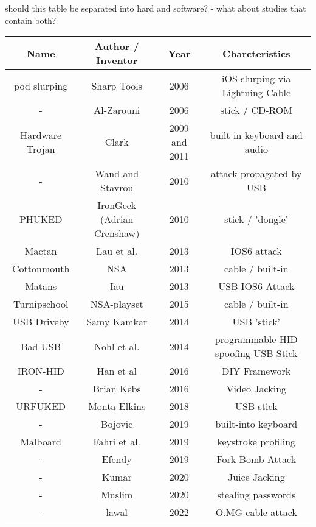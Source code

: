 should this table be separated into hard and software? - what about studies that contain both?
\begin{center}
\begin{tabular}{|c c c c|} 
 \hline
 Name & Author / Inventor & Year & Charcteristics \\ [0.5ex] 
 \hline \hline
 pod slurping & Sharp Tools \cite{SharpIdeasDownloads2006} & 2006 & iOS slurping via Lightning Cable \\
 \hline
 -  &  Al-Zarouni \cite{al-zarouniRealityRisksConsented2006} & 2006 & stick / CD-ROM \\
 \hline
 Hardware Trojan & Clark \cite{clarkHardwareTrojanHorse2009} & 2009 and 2011 & built in keyboard and audio \\
 \hline
 - & Wand and Stavrou \cite{wangExploitingSmartphoneUSB2010} & 2010 & attack propagated by USB \\
 \hline
 PHUKED & IronGeek  (Adrian Crenshaw) \cite{ProgrammableHIDUSB} & 2010 & stick / 'dongle'  \\
 \hline
 Mactan & Lau et al. \cite{lauMactansInjectingMalware2013} & 2013 & IOS6 attack \\
 \hline
 Cottonmouth & NSA \cite{appelbaumCatalogRevealsNSA2013} & 2013 & cable / built-in  \\ 
 \hline
 Matans & Iau \cite{lauMactansInjectingMalware2013} & 2013 & USB IOS6 Attack \\
 \hline
 Turnipschool & NSA-playset \cite{NSAPlaysetTurnipschoolHtml} & 2015 & cable / built-in  \\
 \hline
 USB Driveby & Samy Kamkar \cite{SamyKamkarUSBdriveby} & 2014 & USB 'stick'\\
 \hline
 Bad USB & Nohl et al.\cite{Srlabsbadusbblackhatv1Pdf2014} & 2014 & programmable HID spoofing USB Stick\\
 \hline
 IRON-HID & Han et al \cite{hanIRONHIDCreateYour2016} & 2016 & DIY Framework \\
 \hline
 - & Brian Kebs\cite{RoadWarriorsBeware2016} & 2016 & Video Jacking \\
 \hline
 URFUKED & Monta Elkins \cite{elkinsHackingHardwareIntroducing} & 2018 & USB stick \\
 \hline
 -  & Bojovic \cite{bojovicRisingThreatHardware2019} & 2019 & built-into keyboard \\
 \hline
 Malboard & Fahri et al. \cite{farhiMalboardNovelUser2019} & 2019 & keystroke profiling \\
 \hline
  - & Efendy\cite{efendyExploringPossibilityUSB2019} & 2019 & Fork Bomb Attack \\
 \hline
- & Kumar \cite{kumarJuiceJackingUSB2020} & 2020 & Juice Jacking \\
\hline
- & Muslim \cite{muslimImplementationAnalysisUSB2020} & 2020 & stealing passwords \\
\hline
-  & lawal \cite{lawalFacilitatingCyberenabledFraud2022} & 2022 & O.MG cable attack \\
 \hline 
\end{tabular}
\end{center}

